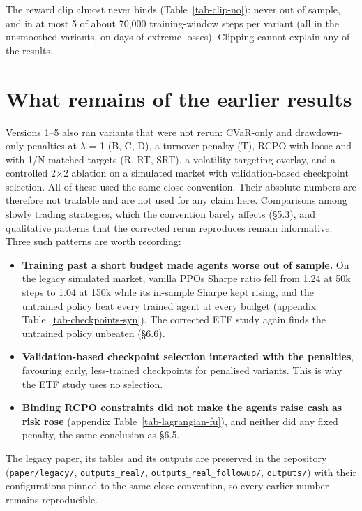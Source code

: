 \documentclass[11pt]{article}
\providecommand{\tightlist}{\setlength{\itemsep}{0pt}\setlength{\parskip}{0pt}}
\begin{document}
The reward clip almost never binds (Table~\ref{tab-clip-no}): never out of sample, and in at most 5 of about 70,000 training-window steps per variant (all in the unsmoothed variants, on days of extreme losses). Clipping cannot explain any of the results.

\section{What remains of the earlier results}\label{s8}

Versions 1--5 also ran variants that were not rerun: CVaR-only and drawdown-only penalties at $\lambda$ = 1 (B, C, D), a turnover penalty (T), RCPO with loose and with 1/N-matched targets (R, RT, SRT), a volatility-targeting overlay, and a controlled 2$\times$2 ablation on a simulated market with validation-based checkpoint selection. All of these used the same-close convention. Their absolute numbers are therefore not tradable and are not used for any claim here. Comparisons among slowly trading strategies, which the convention barely affects (\S{}5.3), and qualitative patterns that the corrected rerun reproduces remain informative. Three such patterns are worth recording:

\begin{itemize}
\tightlist
\item
  \textbf{Training past a short budget made agents worse out of sample.} On the legacy simulated market, vanilla PPO\textquotesingle s Sharpe ratio fell from 1.24 at 50k steps to 1.04 at 150k while its in-sample Sharpe kept rising, and the untrained policy beat every trained agent at every budget (appendix Table~\ref{tab-checkpoints-syn}). The corrected ETF study again finds the untrained policy unbeaten (\S{}6.6).
\item
  \textbf{Validation-based checkpoint selection interacted with the penalties}, favouring early, less-trained checkpoints for penalised variants. This is why the ETF study uses no selection.
\item
  \textbf{Binding RCPO constraints did not make the agents raise cash as risk rose} (appendix Table~\ref{tab-lagrangian-fu}), and neither did any fixed penalty, the same conclusion as \S{}6.5.
\end{itemize}

The legacy paper, its tables and its outputs are preserved in the repository (\texttt{paper/legacy/}, \texttt{outputs\_real/}, \texttt{outputs\_real\_followup/}, \texttt{outputs/}) with their configurations pinned to the same-close convention, so every earlier number remains reproducible.
\end{document}
